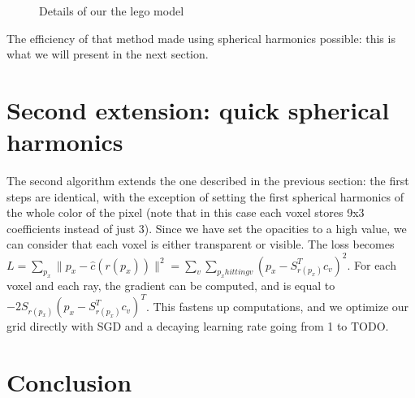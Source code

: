 \documentclass{article}
\begin{document}
\begin{figure}[!h]
\begin{subfigure}{.32\textwidth}
\end{subfigure}
   \caption{Details of our the lego model}
    \label{fig:ourccdetail}
\end{figure}

The efficiency of that method made using spherical harmonics possible: this is what we will present in the next section.

\section{Second extension: quick spherical harmonics}\label{sec:extent2}

The second algorithm extends the one described in the previous section: the first steps are identical, with the exception of setting the first spherical harmonics of the whole color of the pixel (note that in this case each voxel stores 9x3 coefficients instead of just 3). Since we have set the opacities to a high value, we can consider that each voxel is either transparent or visible. The loss becomes $L = \sum_{p_x} \|p_x -\hat{c}(r(p_x)) \|^2 = \sum_{v} \sum_{p_x hitting v} (p_x - S_{r(p_x)}^T c_v)^2$. For each voxel and each ray, the gradient can be computed, and is equal to $ -2 S_{r(p_x)} (p_x - S_{r(p_x)}^T c_v)^T$. This fastens up computations, and we optimize our grid directly with SGD and a decaying learning rate going from 1 to TODO.

\section{Conclusion}
\newpage



\newpage

\newcommand{\animage}[1][example-image]{\adjustbox{valign=m,vspace=0pt}{\texttt{[image: \#1]}}}
\end{document}
